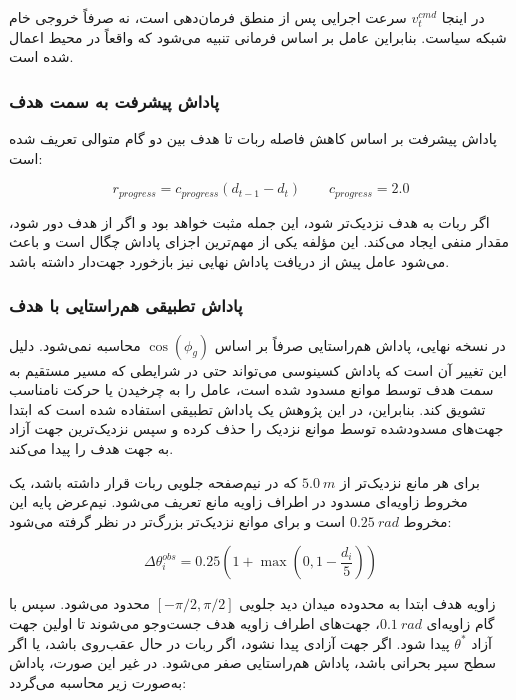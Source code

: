 در اینجا \(v^{cmd}_t\) سرعت اجرایی پس از منطق فرمان‌دهی است، نه صرفاً خروجی خام شبکه سیاست. بنابراین عامل بر اساس فرمانی تنبیه می‌شود که واقعاً در محیط اعمال شده است.

\subsubsection{پاداش پیشرفت به سمت هدف}
\label{subsubsec:progress_reward_final}

پاداش پیشرفت بر اساس کاهش فاصله ربات تا هدف بین دو گام متوالی تعریف شده است:

\begin{equation}
	r_{progress} = c_{progress}(d_{t-1}-d_t)
	\qquad
	c_{progress}=2.0
	\label{eq:progress_reward_final}
\end{equation}

اگر ربات به هدف نزدیک‌تر شود، این جمله مثبت خواهد بود و اگر از هدف دور شود، مقدار منفی ایجاد می‌کند. این مؤلفه یکی از مهم‌ترین اجزای پاداش چگال است و باعث می‌شود عامل پیش از دریافت پاداش نهایی نیز بازخورد جهت‌دار داشته باشد.

\subsubsection{پاداش تطبیقی هم‌راستایی با هدف}
\label{subsubsec:adaptive_heading_reward_final}

در نسخه نهایی، پاداش هم‌راستایی صرفاً بر اساس \(\cos(\phi_g)\) محاسبه نمی‌شود. دلیل این تغییر آن است که پاداش کسینوسی می‌تواند حتی در شرایطی که مسیر مستقیم به سمت هدف توسط موانع مسدود شده است، عامل را به چرخیدن یا حرکت نامناسب تشویق کند. بنابراین، در این پژوهش یک پاداش تطبیقی استفاده شده است که ابتدا جهت‌های مسدودشده توسط موانع نزدیک را حذف کرده و سپس نزدیک‌ترین جهت آزاد به جهت هدف را پیدا می‌کند.

برای هر مانع نزدیک‌تر از \(5.0~m\) که در نیم‌صفحه جلویی ربات قرار داشته باشد، یک مخروط زاویه‌ای مسدود در اطراف زاویه مانع تعریف می‌شود. نیم‌عرض پایه این مخروط \(0.25~rad\) است و برای موانع نزدیک‌تر بزرگ‌تر در نظر گرفته می‌شود:

\begin{equation}
	\Delta\theta^{obs}_i
	=0.25\left(1+\max\left(0,1-\frac{d_i}{5}\right)\right)
	\label{eq:obstacle_blocking_cone_final}
\end{equation}

زاویه هدف ابتدا به محدوده میدان دید جلویی \([-\pi/2,\pi/2]\) محدود می‌شود. سپس با گام زاویه‌ای \(0.1~rad\)، جهت‌های اطراف زاویه هدف جست‌وجو می‌شوند تا اولین جهت آزاد \(\theta^*\) پیدا شود. اگر جهت آزادی پیدا نشود، اگر ربات در حال عقب‌روی باشد، یا اگر سطح سپر بحرانی باشد، پاداش هم‌راستایی صفر می‌شود. در غیر این صورت، پاداش به‌صورت زیر محاسبه می‌گردد:

